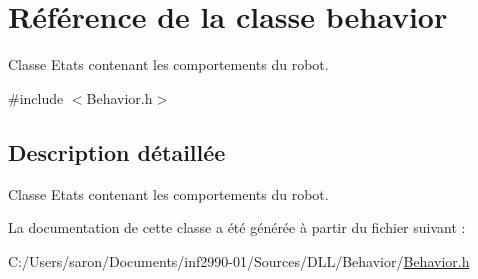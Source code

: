 \hypertarget{classbehavior}{\section{Référence de la classe behavior}
\label{classbehavior}
}


Classe Etats contenant les comportements du robot.  




{\ttfamily \#include $<$Behavior.\-h$>$}



\subsection{Description détaillée}
Classe Etats contenant les comportements du robot. 

La documentation de cette classe a été générée à partir du fichier suivant \-:\begin{DoxyCompactItemize}
\item 
C\-:/\-Users/saron/\-Documents/inf2990-\/01/\-Sources/\-D\-L\-L/\-Behavior/\hyperlink{_behavior_8h}{Behavior.\-h}\end{DoxyCompactItemize}
